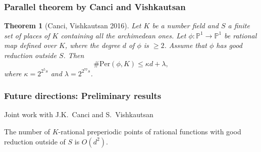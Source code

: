 \documentclass{beamer}
\def\jump{ \quad \\ \vspace{0.7cm} \pause}
\def\PP{{\mathbb P}}
\theoremstyle{thmstyle}
\newtheorem*{mythm}{Theorem}
\theoremstyle{mystyle}
\theoremstyle{qstnstyle}
\begin{document}
\begin{frame}
\frametitle{Parallel theorem by Canci and Vishkautsan}
\begin{mythm}[Canci, Vishkautsan  2016]
  Let $K$ be a number field and $S$ a finite set of places of $K$
  containing all the archimedean ones. Let
  $\phi\colon\PP^1\to\PP^1$ be rational map defined over $K$, where the degree $d$ of $\phi$ is $\geq 2$. Assume that 
  $\phi$ has good reduction outside $S$.  Then 
$$\#\text{Per}(\phi, K) \leq \kappa d+\lambda,$$ 
where $\kappa=2^{2^5s}$ and $\lambda=2^{2^{77}s}$.
\end{mythm}
\end{frame}




%
%
%
%
%


\begin{frame}
\frametitle{Future directions: Preliminary results}
Joint work with J.K.\ Canci and S.\ Vishkautsan \\
\pause

\vspace{5mm}

The number of $K$-rational preperiodic points of rational functions with good reduction outside of $S$ is $O(d^2)$. 


\end{frame}
\end{document}
